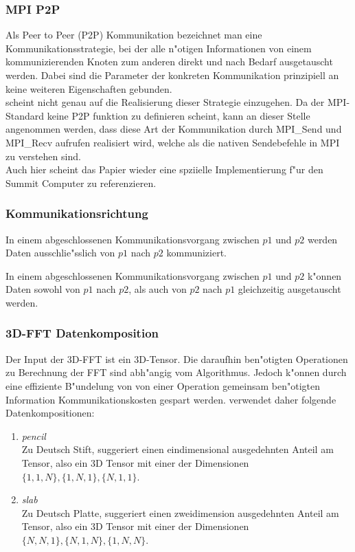 \subsubsection{MPI P2P}
Als Peer to Peer (P2P) Kommunikation bezeichnet man eine Kommunikationsstrategie, bei der alle n"otigen Informationen von einem kommunizierenden Knoten zum anderen direkt und nach Bedarf ausgetauscht werden. 
Dabei sind die Parameter der konkreten Kommunikation prinzipiell an keine weiteren Eigenschaften gebunden.\\
\cite{mainpaper} scheint nicht genau auf die Realisierung dieser Strategie einzugehen. Da der MPI-Standard keine P2P funktion zu definieren scheint, kann an dieser Stelle angenommen werden, dass diese Art der Kommunikation durch MPI\_Send und MPI\_Recv aufrufen realisiert wird, welche als die nativen Sendebefehle in MPI zu verstehen sind.\\
Auch hier scheint das Papier \cite{mainpaper} wieder eine spziielle Implementierung f"ur den Summit Computer zu referenzieren.

\subsubsection{Kommunikationsrichtung}
\begin{defi}
In einem abgeschlossenen Kommunikationsvorgang zwischen $p1$ und $p2$ werden Daten ausschlie"sslich von $p1$ nach $p2$ kommuniziert.
\end{defi}
\begin{defi}
In einem abgeschlossenen Kommunikationsvorgang zwischen $p1$ und $p2$ k"onnen Daten sowohl von $p1$ nach $p2$, als auch von $p2$ nach $p1$ gleichzeitig ausgetauscht werden.
\end{defi}

\subsubsection{3D-FFT Datenkomposition}
Der Input der 3D-FFT ist ein 3D-Tensor. Die daraufhin ben"otigten Operationen zu Berechnung der FFT sind abh"angig vom Algorithmus. Jedoch k"onnen durch eine effiziente B"undelung von von einer Operation gemeinsam ben"otigten Information Kommunikationskosten gespart werden.
\cite{mainpaper} verwendet daher folgende Datenkompositionen:
\begin{enumerate}
	\item \textit{pencil}\\
		Zu Deutsch Stift, suggeriert einen eindimensional ausgedehnten Anteil am Tensor, also ein 3D Tensor mit einer der Dimensionen $\{1,1,N\},\{1,N,1\},\{N,1,1\}$.
	\item \textit{slab}\\
		Zu Deutsch Platte, suggeriert einen zweidimension ausgedehnten Anteil am Tensor, also ein 3D Tensor mit einer der Dimensionen $\{N,N,1\},\{N,1,N\},\{1,N,N\}$.
\end{enumerate}

